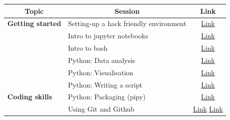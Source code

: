 \documentclass{article}
\begin{document}
\begin{table}[]
    \begin{tabular}{|l|l|c|}
    \hline
    \multicolumn{1}{|c|}{\textbf{Topic}}        & \multicolumn{1}{|c|}{\textbf{Session}}         & \multicolumn{1}{|c|}{\textbf{Link}}                                                                                                 \\ \hline
    \textbf{Getting started}                    & Setting-up a hack friendly environment         & \href{https://psy6983.brainhackmtl.org/modules/installation/}{Link}                                                      \\ \hline
                                                & Intro to jupyter notebooks                     & \href{https://docs.jupyter.org/en/latest/start/index.html}{Link}                                                         \\ \cline{2-3} 
                                                & Intro to bash                                  & \href{https://psy6983.brainhackmtl.org/modules/introduction\_to\_terminal/}{Link}                                        \\ \cline{2-3} 
                                                & Python: Data analysis                          & \href{https://psy6983.brainhackmtl.org/modules/python\_data\_analysis/}{Link}                                            \\ \cline{2-3} 
                                                & Python: Visualisation                          & \href{https://psy6983.brainhackmtl.org/modules/python\_visualization/}{Link}                                             \\ \cline{2-3} 
                                                & Python: Writing a script                       & \href{https://psy6983.brainhackmtl.org/modules/python\_scripts/}{Link}                                                   \\ \cline{2-3} 
    \multirow{-6}{*}{\textbf{Coding skills}}    & Python: Packaging (pipy)                       & \href{https://psy6983.brainhackmtl.org/modules/packaging/}{Link}                                                         \\ \hline
                                                & Using Git and Github                           & \href{https://youtu.be/zh\_WFv0uk7w}{Link} \href{https://psy6983.brainhackmtl.org/modules/git\_github/}{Link} \\ \cline{2-3} 

\end{tabular}
\end{table}
\end{document}
